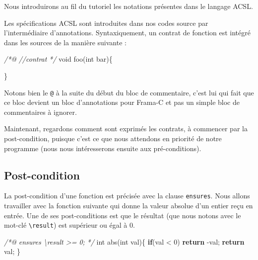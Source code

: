 \documentclass[12pt,francais,]{scrbook}
\newenvironment{Shaded}{}{}
\newcommand{\KeywordTok}[1]{\textcolor[rgb]{0.00,0.44,0.13}{\textbf{{#1}}}}
\newcommand{\DataTypeTok}[1]{\textcolor[rgb]{0.56,0.13,0.00}{{#1}}}
\newcommand{\DecValTok}[1]{\textcolor[rgb]{0.25,0.63,0.44}{{#1}}}
\newcommand{\CommentTok}[1]{\textcolor[rgb]{0.38,0.63,0.69}{\textit{{#1}}}}
\newcommand{\NormalTok}[1]{{#1}}
\begin{document}
Nous introduirons au fil du tutoriel les notations présentes dans le
langage ACSL.

Les spécifications ACSL sont introduites dans nos codes source par
l'intermédiaire d'annotations. Syntaxiquement, un contrat de fonction
est intégré dans les sources de la manière suivante :



\begin{footnotesize}\begin{Shaded}
\begin{Highlighting}[]
\CommentTok{/*@}
\CommentTok{  //contrat}
\CommentTok{*/}
\DataTypeTok{void} \NormalTok{foo(}\DataTypeTok{int} \NormalTok{bar)\{}

\NormalTok{\}}
\end{Highlighting}
\end{Shaded}\end{footnotesize}

Notons bien le \texttt{@} à la suite du début du bloc de commentaire,
c'est lui qui fait que ce bloc devient un bloc d'annotations pour
Frama-C et pas un simple bloc de commentaires à ignorer.

Maintenant, regardons comment sont exprimés les contrats, à commencer
par la post-condition, puisque c'est ce que nous attendons en priorité
de notre programme (nous nous intéresserons ensuite aux pré-conditions).

\subsection{Post-condition}\label{post-condition}

La post-condition d'une fonction est précisée avec la clause
\texttt{ensures}. Nous allons travailler avec la fonction suivante qui
donne la valeur absolue d'un entier reçu en entrée. Une de ses
post-conditions est que le résultat (que nous notons avec le mot-clé
\texttt{\textbackslash{}result}) est supérieur ou égal à 0.

\begin{footnotesize}\begin{Shaded}
\begin{Highlighting}[]
\CommentTok{/*@}
\CommentTok{  ensures \textbackslash{}result >= 0;}
\CommentTok{*/}
\DataTypeTok{int} \NormalTok{abs(}\DataTypeTok{int} \NormalTok{val)\{}
  \KeywordTok{if}\NormalTok{(val < }\DecValTok{0}\NormalTok{) }\KeywordTok{return} \NormalTok{-val;}
  \KeywordTok{return} \NormalTok{val;}
\NormalTok{\}}
\end{Highlighting}
\end{Shaded}\end{footnotesize}
\end{document}
